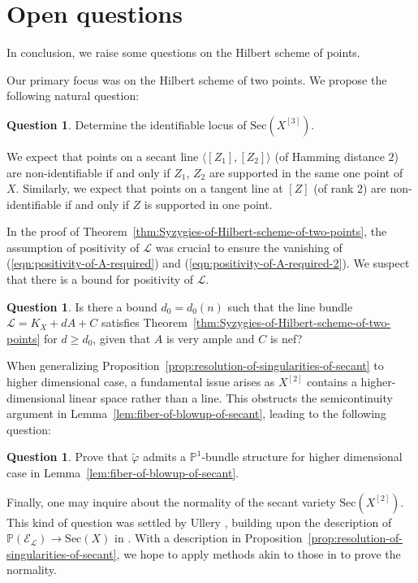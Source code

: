 \documentclass[a4paper]{amsart}
\numberwithin{equation}{section}
\theoremstyle{plain}
\theoremstyle{definition}
\newtheorem{ques}[thm]{Question}
\theoremstyle{remark}
\numberwithin{figure}{section}
\numberwithin{table}{section}
\numberwithin{equation}{section}
\def \PP {\mathbb{P}}
\def \Ecal {\mathcal{E}}
\def \Lcal {\mathcal{L}}
\begin{document}
\section{Open questions} \label{sec:questions}

In conclusion, we raise some questions on the Hilbert scheme of points.

Our primary focus was on the Hilbert scheme of two points.
We propose the following natural question:

\begin{ques}
    Determine the identifiable locus of $\mathrm{Sec}(X^{[3]})$.
\end{ques}

We expect that points on a secant line $\langle [Z_1], [Z_2] \rangle$ (of Hamming distance $2$) are non-identifiable if and only if $Z_1$, $Z_2$ are supported in the same one point of $X$.
Similarly, we expect that points on a tangent line at $[Z]$ (of rank $2$) are non-identifiable if and only if $Z$ is supported in one point.

In the proof of Theorem~\ref{thm:Syzygies-of-Hilbert-scheme-of-two-points}, the assumption of positivity of $\Lcal$ was crucial to ensure the vanishing of (\ref{eqn:positivity-of-A-required}) and (\ref{eqn:positivity-of-A-required-2}).
We suspect that there is a bound for positivity of $\Lcal$.

\begin{ques}
    Is there a bound $d_0 = d_0(n)$ such that the line bundle $\Lcal = K_X + dA + C$ satisfies Theorem~\ref{thm:Syzygies-of-Hilbert-scheme-of-two-points} for $d \geq d_0$, given that $A$ is very ample and $C$ is nef? 
\end{ques}

When generalizing Proposition~\ref{prop:resolution-of-singularities-of-secant} to higher dimensional case, a fundamental issue arises as $X^{[2]}$ contains a higher-dimensional linear space rather than a line.
This obstructs the semicontinuity argument in Lemma~\ref{lem:fiber-of-blowup-of-secant}, leading to the following question:

\begin{ques}
    Prove that $\widetilde{\varphi}$ admits a $\PP^1$-bundle structure for higher dimensional case in Lemma~\ref{lem:fiber-of-blowup-of-secant}.
\end{ques}

Finally, one may inquire about the normality of the secant variety $\mathrm{Sec}(X^{[2]})$.
This kind of question was settled by Ullery \cite{Ullery2016}, building upon the description of $\PP(\Ecal_{\Lcal}) \rightarrow \mathrm{Sec}(X)$ in \cite{Vermeire2001}.
With a description in Proposition~\ref{prop:resolution-of-singularities-of-secant}, we hope to apply methods akin to those in \cite{Ullery2016} to prove the normality.
\end{document}
